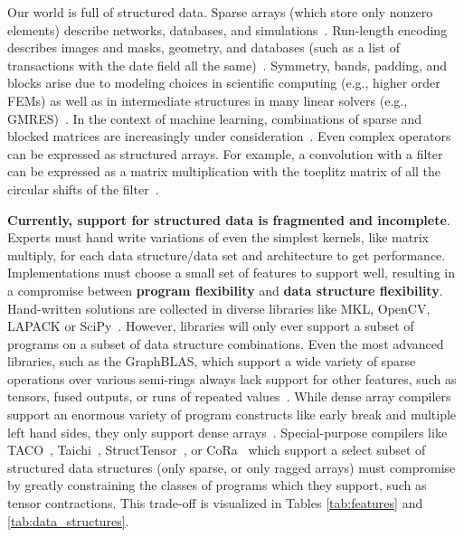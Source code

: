 Our world is full of structured data.
%
Sparse arrays (which store only nonzero elements) describe networks, databases, and simulations~\cite{abhyankarpetsc, bell2007lessons, mcauley2013hidden, balay2020petsc}.
%
Run-length encoding describes images and masks, geometry, and
databases (such as a list of transactions with the date field all the same)~\cite{shi2020column,golomb1966run}.
%
Symmetry, bands, padding, and blocks arise due to modeling choices in scientific computing (e.g., higher order FEMs) as well as in intermediate structures in many linear solvers (e.g., GMRES)~\cite{ded, saad2003iterative, o2009scientific}.
%
In the context of machine learning, combinations of sparse and blocked matrices are increasingly under consideration~\cite{dao2022monarch}.
%
Even complex operators can be expressed as structured arrays.
%
For example, a convolution with a filter can be expressed as a matrix multiplication
with the toeplitz matrix of all the circular shifts of the filter~\cite{sze2017efficient}.

%
\textbf{Currently, support for structured data is fragmented and incomplete}.
%
Experts must hand write variations of even the simplest kernels, like matrix
multiply, for each data structure/data set and architecture to get performance.
%
Implementations must choose a small set of features to support well, resulting
in a compromise between \textbf{program flexibility} and \textbf{data structure
flexibility}.
%
Hand-written solutions are collected in diverse libraries like
MKL, OpenCV, LAPACK or SciPy~\cite{ bradski2000opencv, anderson1999lapack, virtanen2020scipy, psarras2022linear}. 
%
However, libraries will only ever support a subset of
programs on a subset of data structure combinations.
%
Even the most advanced
libraries, such as the GraphBLAS, which support a wide variety of sparse
operations over various semi-rings always lack support for other features, such
as tensors, fused outputs, or runs of repeated values~\cite{bulucc2017design, mattson2019lagraph}.
%
While dense array
compilers support an enormous variety of program constructs like early break and
multiple left hand sides, they only support dense arrays~\cite{ragan-kelley_halide_2013,grosser2012polly}.  
%
Special-purpose
compilers like TACO~\cite{kjolstad_tensor_2019}, Taichi~\cite{hu_taichi_2019}, StructTensor~\cite{ghorbani2023compiling}, or CoRa~\cite{fegade_cora_2022} which support a select subset of structured data
structures (only sparse, or only ragged arrays) must compromise by greatly
constraining the classes of programs which they support, such as tensor
contractions.
%
This trade-off is visualized in Tables \ref{tab:features} and \ref{tab:data_structures}.
%

